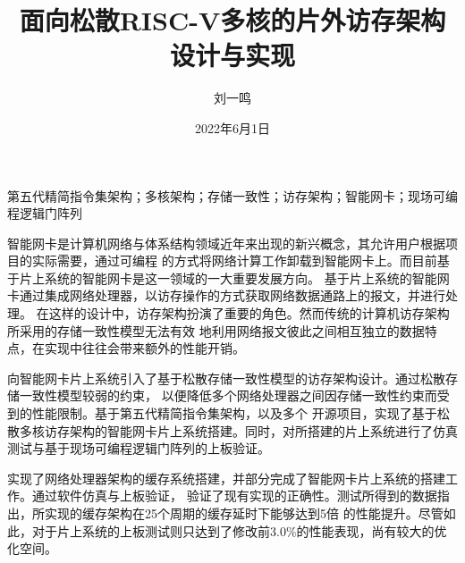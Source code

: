 \documentclass[supercite,notofont,hustthesis]{HustGraduPaper}
\title{面向松散RISC-V多核的片外访存架构设计与实现}
\author{刘一鸣}
\date{2022年6月1日}
\begin{document}
\maketitle

\statement

\clearpage


\begin{cnabstract}{第五代精简指令集架构；多核架构；存储一致性；访存架构；智能网卡；现场可编程逻辑门阵列}

智能网卡是计算机网络与体系结构领域近年来出现的新兴概念，其允许用户根据项目的实际需要，通过可编程
的方式将网络计算工作卸载到智能网卡上。而目前基于片上系统的智能网卡是这一领域的一大重要发展方向。
基于片上系统的智能网卡通过集成网络处理器，以访存操作的方式获取网络数据通路上的报文，并进行处理。
在这样的设计中，访存架构扮演了重要的角色。然而传统的计算机访存架构所采用的存储一致性模型无法有效
地利用网络报文彼此之间相互独立的数据特点，在实现中往往会带来额外的性能开销。

向智能网卡片上系统引入了基于松散存储一致性模型的访存架构设计。通过松散存储一致性模型较弱的约束，
以便降低多个网络处理器之间因存储一致性约束而受到的性能限制。基于第五代精简指令集架构，以及多个
开源项目，实现了基于松散多核访存架构的智能网卡片上系统搭建。同时，对所搭建的片上系统进行了仿真
测试与基于现场可编程逻辑门阵列的上板验证。

实现了网络处理器架构的缓存系统搭建，并部分完成了智能网卡片上系统的搭建工作。通过软件仿真与上板验证，
验证了现有实现的正确性。测试所得到的数据指出，所实现的缓存架构在25个周期的缓存延时下能够达到5倍
的性能提升。尽管如此，对于片上系统的上板测试则只达到了修改前3.0\%的性能表现，尚有较大的优化空间。

\end{cnabstract}
\end{document}
